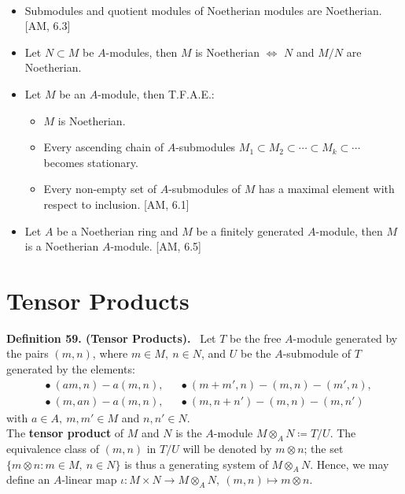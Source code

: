 \documentclass[12pt,a4paper,footinclude=true,headinclude=true]{scrbook} %
\newenvironment{proposition}[2][]
{\renewcommand\theinnercustomprop{#2}\innercustomprop[#1] 
\begin{mdframed}[backgroundcolor=gray!20]\ }
{\end{mdframed}\endinnercustomprop}
\newenvironment{definition}[2][Definition]
    { \begin{mdframed}[backgroundcolor=gray!20] \textbf{#1 #2.}\ }
    {  \end{mdframed}}
\begin{document}
\begin{proposition}{58}
    \begin{itemize}
        \item[(a)] Submodules and quotient modules of Noetherian modules are Noetherian. [AM, 6.3]
        \item[(b)] Let $N\subset M$ be $A$-modules, then $M$ is Noetherian $\Longleftrightarrow$ $N$ and $M/N$ are Noetherian.
        \item[(c)] Let $M$ be an $A$-module, then T.F.A.E.:
        \begin{itemize}
            \item[(i)] $M$ is Noetherian.
            \item[(ii)] Every ascending chain of $A$-submodules $M_1\subset M_2\subset\cdots\subset M_k\subset\cdots$ becomes stationary.
            \item[(iii)] Every non-empty set of $A$-submodules of $M$ has a maximal element with respect to inclusion. [AM, 6.1]
        \end{itemize}
        \item[(d)] Let $A$ be a Noetherian ring and $M$ be a finitely generated $A$-module, then $M$ is a Noetherian $A$-module. [AM, 6.5]
    \end{itemize}
\end{proposition}

\newpage

\section{Tensor Products}
\begin{definition}{59. (Tensor Products)}
    Let $T$ be the free $A$-module generated by the pairs $(m,n)$, where $m\in M,\ n\in N$, and $U$ be the $A$-submodule of $T$ generated by the elements:
    \begin{align*}
        &\bullet\ (am,n)-a(m,n), &&\bullet\ (m+m',n)-(m,n)-(m',n),\\
        &\bullet\ (m,an)-a(m,n), &&\bullet\ (m,n+n')-(m,n)-(m,n')
    \end{align*}
    with $a\in A,\ m,m'\in M$ and $n,n'\in N$.\\
    The \textbf{tensor product} of $M$ and $N$ is the $A$-module $M\otimes_AN\coloneqq T/U$. The equivalence class of $(m,n)$ in $T/U$ will be denoted by $m\otimes n$; the set $\{m\otimes n:m\in M,\ n\in N\}$ is thus a generating system of $M\otimes_AN$. Hence, we may define an $A$-linear map $\iota:M\times N\to M\otimes_AN,\ (m,n)\mapsto m\otimes n$.
\end{definition}
\end{document}
